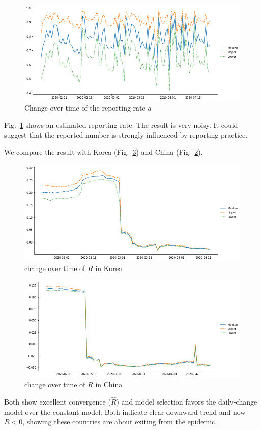 \documentclass{amsart}
\begin{document}
\begin{figure}[h]
 \centering
 \includegraphics[width=\linewidth]{fig/q-Japan.png}
 \caption{Change over time of the reporting rate $q$}
 \label{fig:q}
\end{figure}

Fig.~\ref{fig:q} shows an estimated reporting rate.
The result is very noisy.
It could suggest that the reported number is strongly influenced by reporting practice.

We compare the result with Korea (Fig.~\ref{fig:b-China}) and China (Fig.~\ref{fig:b-Korea}).
\begin{figure}[h]
    \centering
    \includegraphics[width=\linewidth]{fig/beta-Korea.png}
    \caption{ change over time of $R$ in Korea}
    \label{fig:b-Korea}
\end{figure}
\begin{figure}[h]
    \centering
    \includegraphics[width=\linewidth]{fig/beta-China.png}
    \caption{ change over time of $R$ in China}
    \label{fig:b-China}
\end{figure}
Both show excellent convergence ($\hat{R}$) and model selection favors the daily-change model over the constant model.
Both indicate clear downward trend and now $R < 0$, showing these countries are about exiting from the epidemic.
\end{document}
